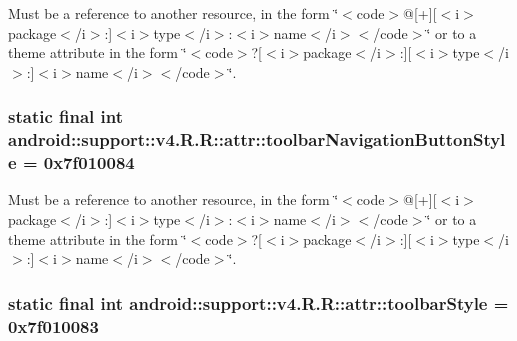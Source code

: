 Must be a reference to another resource, in the form \char`\"{}$<$code$>$@\mbox{[}+\mbox{]}\mbox{[}$<$i$>$package$<$/i$>$:\mbox{]}$<$i$>$type$<$/i$>$:$<$i$>$name$<$/i$>$$<$/code$>$\char`\"{} or to a theme attribute in the form \char`\"{}$<$code$>$?\mbox{[}$<$i$>$package$<$/i$>$:\mbox{]}\mbox{[}$<$i$>$type$<$/i$>$:\mbox{]}$<$i$>$name$<$/i$>$$<$/code$>$\char`\"{}. \hypertarget{classandroid_1_1support_1_1v4_1_1_r_1_1attr_407d785f30938e6f2b0237fd3fca34f3}{
\subsubsection[{toolbarNavigationButtonStyle}]{\setlength{\rightskip}{0pt plus 5cm}static final int android::support::v4.R.R::attr::toolbarNavigationButtonStyle = 0x7f010084}}
\label{classandroid_1_1support_1_1v4_1_1_r_1_1attr_407d785f30938e6f2b0237fd3fca34f3}


Must be a reference to another resource, in the form \char`\"{}$<$code$>$@\mbox{[}+\mbox{]}\mbox{[}$<$i$>$package$<$/i$>$:\mbox{]}$<$i$>$type$<$/i$>$:$<$i$>$name$<$/i$>$$<$/code$>$\char`\"{} or to a theme attribute in the form \char`\"{}$<$code$>$?\mbox{[}$<$i$>$package$<$/i$>$:\mbox{]}\mbox{[}$<$i$>$type$<$/i$>$:\mbox{]}$<$i$>$name$<$/i$>$$<$/code$>$\char`\"{}. \hypertarget{classandroid_1_1support_1_1v4_1_1_r_1_1attr_5bcb792a379d9c3dbecc780418df4a75}{
\subsubsection[{toolbarStyle}]{\setlength{\rightskip}{0pt plus 5cm}static final int android::support::v4.R.R::attr::toolbarStyle = 0x7f010083}}
\label{classandroid_1_1support_1_1v4_1_1_r_1_1attr_5bcb792a379d9c3dbecc780418df4a75}


